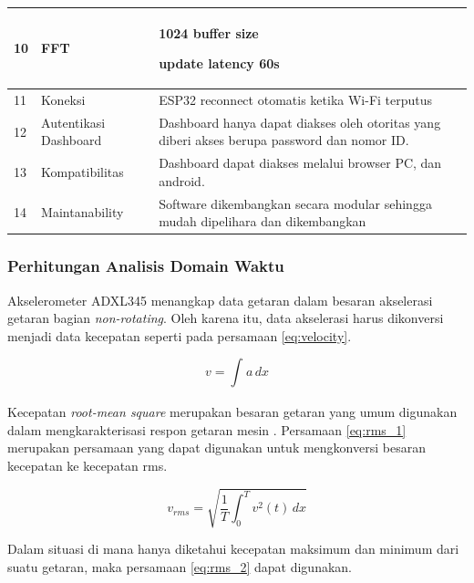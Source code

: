 \documentclass{elsinta}
\begin{document}
\begin{longtable}{|p{1.5cm}|p{3cm}|p{9cm}|}
    10 & FFT &
    1024 buffer size

    update latency 60s
    \\
    \hline
    
    11 & Koneksi &
    ESP32 reconnect otomatis ketika Wi-Fi terputus
    \\
    \hline
    
    12 & Autentikasi Dashboard &
    Dashboard hanya dapat diakses oleh otoritas yang diberi akses berupa password dan nomor ID.
    \\
    \hline

    13 & Kompatibilitas &
    Dashboard dapat diakses melalui browser PC, dan android.
    \\
    \hline

    14 & Maintanability &
    Software dikembangkan secara modular sehingga mudah dipelihara dan dikembangkan
    \\
    \hline

\end{longtable}

\subsubsection{Perhitungan Analisis Domain Waktu}
    Akselerometer ADXL345 menangkap data getaran
    dalam besaran akselerasi getaran bagian \textit{non-rotating}. 
    Oleh karena itu,
    data akselerasi harus dikonversi menjadi data
    kecepatan seperti pada persamaan \ref{eq:velocity}\cite{InternationalOrganizationforStandardization2003}.

    \begin{equation}
        \label{eq:velocity}
        v=\int_{}^{}a\,dx
    \end{equation}

    Kecepatan \textit{root-mean square} merupakan
    besaran getaran yang umum digunakan dalam
    mengkarakterisasi respon getaran mesin \cite{InternationalOrganizationforStandardization2003}.
    Persamaan \ref{eq:rms_1} merupakan persamaan
    yang dapat digunakan untuk mengkonversi besaran
    kecepatan ke kecepatan rms.

    \begin{equation}
        \label{eq:rms_1}
        v_{rms}=\sqrt{\frac{1}{T} \int_{0}^{T} v^{2}(t)\,dx}
    \end{equation}

    Dalam situasi di mana hanya diketahui kecepatan
    maksimum dan minimum dari suatu getaran, maka
    persamaan \ref{eq:rms_2} dapat digunakan.
\end{document}
